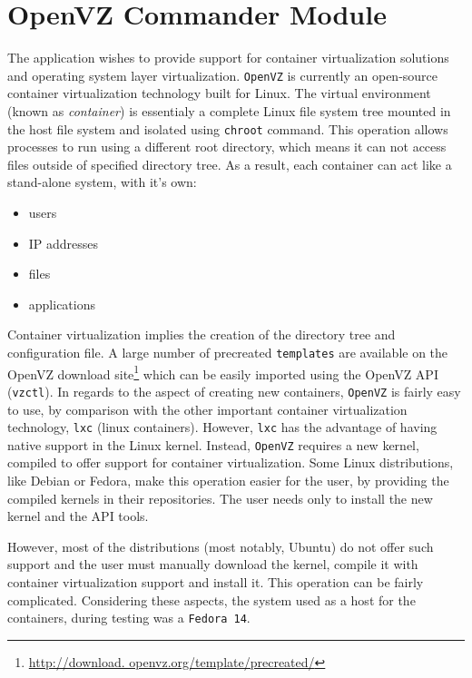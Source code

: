 \chapter{OpenVZ Commander Module} \label{chapter:openvz}
The \texttt{\project}application wishes to provide support for container 
virtualization solutions and operating system layer virtualization. \texttt{OpenVZ}
is currently an open-source container virtualization technology built for 
Linux. The virtual environment (known as \emph{container}) is essentialy a 
complete Linux file system tree mounted in the host file system and 
isolated using \texttt{chroot} command. This operation allows processes to run 
using a different root directory, which means it can not access files 
outside of specified directory tree. As a result, each container can act 
like a stand-alone system, with it's own:
\begin{itemize}
  \item users
  \item IP addresses
  \item files
  \item applications
\end{itemize}

Container virtualization implies the creation of the directory tree and 
configuration file. A large number of precreated \texttt{templates} are 
available on the OpenVZ download site\footnote{\url {http://download.
openvz.org/template/precreated/}} 
which can be easily imported using the OpenVZ API (\texttt{vzctl}). 
In regards to the aspect of creating new containers, \texttt{OpenVZ} is 
fairly easy to use, by comparison with the other important container virtualization 
technology, \texttt{lxc} (linux containers). However, \texttt{lxc} has the 
advantage of having native support in the Linux kernel. Instead, \texttt{OpenVZ} 
requires a new kernel, compiled to offer support for container virtualization. 
Some Linux distributions, like Debian or Fedora, make this operation easier for 
the user, by providing the compiled kernels in their repositories. The user needs 
only to install the new kernel and the API tools.


However, most of the distributions (most notably, Ubuntu) do not offer such 
support and the user must manually download the kernel, compile it with 
container virtualization support and install it. This operation can be fairly 
complicated. Considering these aspects, the system used as a host for the 
containers, during testing was a \texttt{Fedora 14}.


